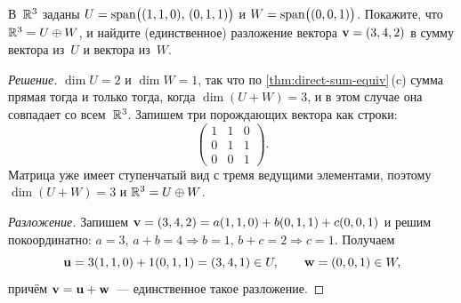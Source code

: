 \begin{problem}
\label{prob:direct-sum-decomp}
В~$\mathbb{R}^3$ заданы $U = \operatorname{span}\bigl((1, 1, 0),\, (0, 1, 1)\bigr)$ и
$W = \operatorname{span}\bigl((0, 0, 1)\bigr)$. Покажите, что $\mathbb{R}^3 = U \oplus W$, и
найдите (единственное) разложение вектора $\mathbf{v} = (3, 4, 2)$ в
сумму вектора из~$U$ и вектора из~$W$.
\end{problem}

\begin{proof}[Решение]
$\dim U = 2$ и $\dim W = 1$, так что по
\cref{thm:direct-sum-equiv}\,(c) сумма прямая тогда и только тогда,
когда $\dim(U + W) = 3$, и в этом случае она совпадает со всем~$\mathbb{R}^3$.
Запишем три порождающих вектора как строки:
\[
  \begin{pmatrix}
    1 & 1 & 0 \\
    0 & 1 & 1 \\
    0 & 0 & 1
  \end{pmatrix}.
\]
Матрица уже имеет ступенчатый вид с тремя ведущими элементами, поэтому
$\dim(U + W) = 3$ и $\mathbb{R}^3 = U \oplus W$.

\emph{Разложение.} Запишем
$\mathbf{v} = (3, 4, 2) = a(1,1,0) + b(0,1,1) + c(0,0,1)$ и решим
покоординатно: $a = 3$, $a + b = 4 \Rightarrow b = 1$,
$b + c = 2 \Rightarrow c = 1$. Получаем
\[
  \mathbf{u} = 3(1, 1, 0) + 1(0, 1, 1) = (3, 4, 1) \in U,
  \qquad
  \mathbf{w} = (0, 0, 1) \in W,
\]
причём $\mathbf{v} = \mathbf{u} + \mathbf{w}$~--- единственное такое
разложение.
\end{proof}
